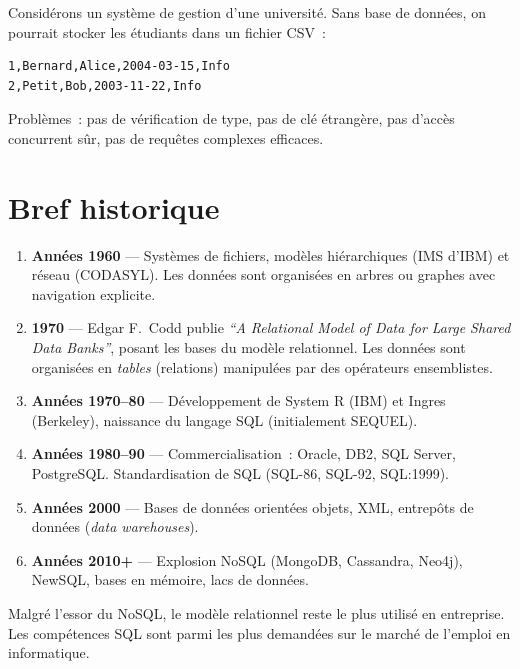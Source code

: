 \begin{exemple}
Consid\'erons un syst\`eme de gestion d'une universit\'e. Sans base de donn\'ees,
on pourrait stocker les \'etudiants dans un fichier CSV~:
\begin{verbatim}
1,Bernard,Alice,2004-03-15,Info
2,Petit,Bob,2003-11-22,Info
\end{verbatim}
Probl\`emes~: pas de v\'erification de type, pas de cl\'e \'etrang\`ere, pas d'acc\`es
concurrent s\^ur, pas de requ\^etes complexes efficaces.
\end{exemple}

\section{Bref historique}

\begin{enumerate}
    \item \textbf{Ann\'ees 1960} --- Syst\`emes de fichiers, mod\`eles hi\'erarchiques (IMS d'IBM)
          et r\'eseau (CODASYL). Les donn\'ees sont organis\'ees en arbres ou graphes
          avec navigation explicite.
    \item \textbf{1970} --- Edgar F.~Codd publie \emph{``A Relational Model of Data for
          Large Shared Data Banks''}, posant les bases du mod\`ele relationnel.
          Les donn\'ees sont organis\'ees en \emph{tables} (relations) manipul\'ees par
          des op\'erateurs ensemblistes.
    \item \textbf{Ann\'ees 1970--80} --- D\'eveloppement de System R (IBM) et Ingres (Berkeley),
          naissance du langage SQL (initialement SEQUEL).
    \item \textbf{Ann\'ees 1980--90} --- Commercialisation~: Oracle, DB2, SQL Server,
          PostgreSQL. Standardisation de SQL (SQL-86, SQL-92, SQL:1999).
    \item \textbf{Ann\'ees 2000} --- Bases de donn\'ees orient\'ees objets, XML, entrep\^ots
          de donn\'ees (\emph{data warehouses}).
    \item \textbf{Ann\'ees 2010+} --- Explosion NoSQL (MongoDB, Cassandra, Neo4j),
          NewSQL, bases en m\'emoire, lacs de donn\'ees.
\end{enumerate}

\begin{remarque}
Malgr\'e l'essor du NoSQL, le mod\`ele relationnel reste le plus utilis\'e
en entreprise. Les comp\'etences SQL sont parmi les plus demand\'ees
sur le march\'e de l'emploi en informatique.
\end{remarque}


